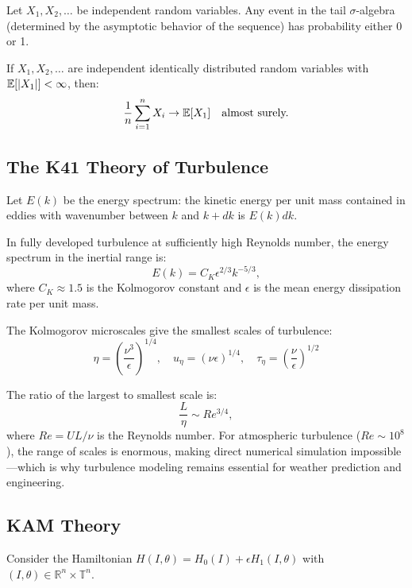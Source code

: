 \begin{theorem}
Let $X_1, X_2, \dots$ be independent random variables. Any event in the tail $\sigma$-algebra (determined by the asymptotic behavior of the sequence) has probability either 0 or 1.
\end{theorem}

\begin{theorem}
If $X_1, X_2, \dots$ are independent identically distributed random variables with $\operatorname{\mathbb{E}}[|X_1|] < \infty$, then:
\[
\frac{1}{n}\sum_{i=1}^n X_i \to \operatorname{\mathbb{E}}[X_1] \quad \text{almost surely.}
\]
\end{theorem}

\subsection{The K41 Theory of Turbulence}

Let $E(k)$ be the energy spectrum: the kinetic energy per unit mass contained in eddies with wavenumber between $k$ and $k+dk$ is $E(k)dk$.

\begin{theorem}
In fully developed turbulence at sufficiently high Reynolds number, the energy spectrum in the inertial range is:
\[
E(k) = C_K \epsilon^{2/3} k^{-5/3},
\]
where $C_K \approx 1.5$ is the Kolmogorov constant and $\epsilon$ is the mean energy dissipation rate per unit mass.
\end{theorem}

The Kolmogorov microscales give the smallest scales of turbulence:
\[
\eta = \left(\frac{\nu^3}{\epsilon}\right)^{1/4}, \quad u_\eta = (\nu \epsilon)^{1/4}, \quad \tau_\eta = \left(\frac{\nu}{\epsilon}\right)^{1/2}
\]

The ratio of the largest to smallest scale is:
\[
\frac{L}{\eta} \sim Re^{3/4},
\]
where $Re = UL/\nu$ is the Reynolds number. For atmospheric turbulence ($Re \sim 10^8$), the range of scales is enormous, making direct numerical simulation impossible---which is why turbulence modeling remains essential for weather prediction and engineering.

\subsection{KAM Theory}

Consider the Hamiltonian $H(I, \theta) = H_0(I) + \epsilon H_1(I, \theta)$ with $(I, \theta) \in \mathbb{R}^n \times \mathbb{T}^n$.

